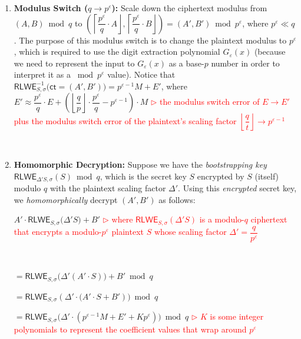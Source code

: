 \begin{enumerate}
\item \textbf{Modulus Switch (\boldmath$q \rightarrow p^\varepsilon$):} Scale down the ciphertext modulus from $(A, B) \bmod q$ to $\left(\left\lceil \dfrac{p^\varepsilon}{q}\cdot A\right\rfloor, \left\lceil \dfrac{p^\varepsilon}{q}\cdot B\right\rfloor\right) = (A', B') \bmod p^\varepsilon$, where $p^\varepsilon \ll q$. The purpose of this modulus switch is to change the plaintext modulus to $p^\varepsilon$, which is required to use the digit extraction polynomial $G_\varepsilon(x)$ (because we need to represent the input to $G_\varepsilon(x)$ as a base-$p$ number in order to interpret it as a $\bmod p^\varepsilon$ value). Notice that $\textsf{RLWE}_{S, \sigma}^{-1}\bm(\textsf{ct} = (A', B') \bm) = p^{\varepsilon-1}M + E'$, where $E' \approx \dfrac{p^\varepsilon}{q}\cdot E  + \left(\left\lfloor\dfrac{q}{p}\right\rfloor\cdot\dfrac{p^\varepsilon}{q} - p^{\varepsilon-1}\right)\cdot M$ \textcolor{red}{ $\rhd$ the modulus switch error of $E \rightarrow E'$ plus the modulus switch error of the plaintext's scaling factor $\left\lfloor\dfrac{q}{t}\right\rfloor \rightarrow p^{\varepsilon-1}$}

$ $

\item \textbf{Homomorphic Decryption:} Suppose we have the \textit{bootstrapping key} $\textsf{RLWE}_{\Delta' S, \sigma}(S) \bmod q$, which is the secret key $S$ encrypted by $S$ (itself) modulo $q$ with the plaintext scaling factor $\Delta'$. Using this \textit{encrypted} secret key, we \textit{homomorphically} decrypt $(A', B')$ as follows:

$A' \cdot \textsf{RLWE}_{S, \sigma}\bm(\Delta' S\bm) + B'$ \textcolor{red}{ $\rhd$ where $\textsf{RLWE}_{S, \sigma}(\Delta' S)$ is a modulo-$q$ ciphertext that encrypts a modulo-$p^\varepsilon$ plaintext $S$ whose scaling factor $\Delta' = \dfrac{q}{p^\varepsilon}$ }

$ $

$= \textsf{RLWE}_{S, \sigma}\bm(\Delta' (A' \cdot S)\bm) + B'  \bmod q$

$= \textsf{RLWE}_{S, \sigma}(\Delta' \cdot \bm(A'\cdot S + B')\bm) \bmod q$

$ = \textsf{RLWE}_{S, \sigma}\bm(\Delta' \cdot (p^{\varepsilon-1} M  + E' + Kp^\varepsilon)\bm) \bmod q$ \textcolor{red}{ $\rhd$ $K$ is some integer polynomials to represent the coefficient values that wrap around $p^\varepsilon$}



\end{enumerate}
